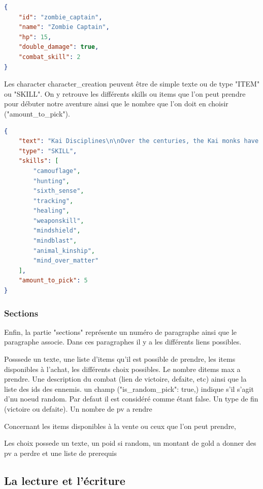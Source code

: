\begin{lstlisting}[language=json, caption=Exemple de personnage]
{
	"id": "zombie_captain",
	"name": "Zombie Captain",
	"hp": 15,
	"double_damage": true,
	"combat_skill": 2
}
\end{lstlisting}

			Les character character\_creation peuvent être de simple texte ou de type "ITEM" ou "SKILL". On y retrouve les différents skills ou items que l'on peut prendre pour débuter notre aventure ainsi que le nombre que l'on doit en choisir ("amount\_to\_pick").

\begin{lstlisting}[language=json, caption=Exemple de character\_creation]
{
	"text": "Kai Disciplines\n\nOver the centuries, the Kai monks have mastered the skills of the warrior. These skills are known as the Kai Disciplines, [...]",
	"type": "SKILL",
	"skills": [
		"camouflage",
		"hunting",
		"sixth_sense",
		"tracking",
		"healing",
		"weaponskill",
		"mindshield",
		"mindblast",
		"animal_kinship",
		"mind_over_matter"
	],
	"amount_to_pick": 5
}
\end{lstlisting}

		\subsubsection{Sections}

			Enfin, la partie "sections" représente un numéro de paragraphe ainsi que le paragraphe associe. Dans ces paragraphes il y a les différents liens possibles.

			Posssede un texte, une liste d'items qu'il est possible de prendre, les items disponibles à l'achat, les différents choix possibles. Le nombre ditems max a prendre. Une description du combat (lien de victoire, defaite, etc) ainsi que la liste des ids des ennemis. un champ ("is\_random\_pick": true,) indique s'il s'agit d'nu noeud random. Par defaut il est considéré comme étant false. Un type de fin (victoire ou defaite). Un nombre de pv a rendre

			Concernant les items disponibles à la vente ou ceux que l'on peut prendre,

			Les choix possede un texte, un poid si random, un montant de gold a donner des pv a perdre et une liste de prerequis

		\subsection{La lecture et l'écriture}

